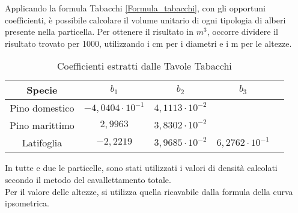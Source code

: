Applicando la formula Tabacchi \ref{Formula_tabacchi}, con gli opportuni coefficienti, è possibile calcolare il volume unitario di ogni tipologia di alberi presente nella particella. Per ottenere il risultato in $m^3$, occorre dividere il risultato trovato per 1000, utilizzando i cm per i diametri e i m per le altezze.
\begin{table}[H]
\caption{Coefficienti estratti dalle Tavole Tabacchi}
\centering
\begin{tabular}{ccccc}
\toprule
Specie & $b_1$ & $b_2$ & $b_3$\\
\midrule
Pino domestico & $-4,0404 \cdot 10^{-1}$   & $4,1113 \cdot 10^{-2}$  &\\
Pino marittimo & $2,9963$  & $3,8302 \cdot 10^{-2}$  &\\
Latifoglia       &  $-2,2219$  & $3,9685 \cdot 10^{-2}$ & $6,2762 \cdot 10^{-1}$ \\

\bottomrule
\end{tabular}
\label{tab:coeff_tabacchi}
\end{table}

In tutte e due le particelle, sono stati utilizzati i valori di densità calcolati secondo il metodo del cavallettamento totale.\\
Per il valore delle altezze, si utilizza quella ricavabile dalla formula della curva ipsometrica.